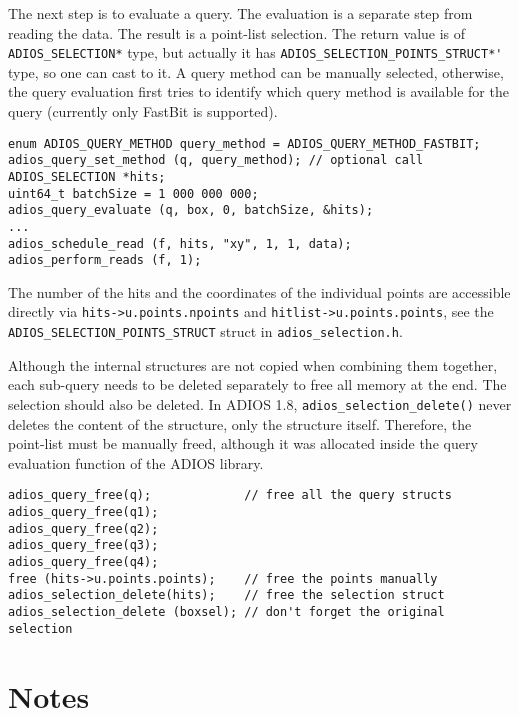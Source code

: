 \noindent The next step is to evaluate a query. The evaluation is a separate step from reading the data. The result is a point-list selection. The return value is of \verb+ADIOS_SELECTION*+ type, but actually it has \linebreak \verb+ADIOS_SELECTION_POINTS_STRUCT*'+ type, so one can cast to it. A query method can be manually selected, otherwise, the query evaluation first tries to identify which query method is available for the query (currently only FastBit is supported). 

\begin{lstlisting}[alsolanguage=C]
enum ADIOS_QUERY_METHOD query_method = ADIOS_QUERY_METHOD_FASTBIT;
adios_query_set_method (q, query_method); // optional call
ADIOS_SELECTION *hits;
uint64_t batchSize = 1 000 000 000;
adios_query_evaluate (q, box, 0, batchSize, &hits);
...
adios_schedule_read (f, hits, "xy", 1, 1, data);
adios_perform_reads (f, 1);
\end{lstlisting}

The number of the hits and the coordinates of the individual points are accessible directly via 
\linebreak \verb+hits->u.points.npoints+ and \verb+hitlist->u.points.points+, see the \verb+ADIOS_SELECTION_POINTS_STRUCT+ struct in \verb+adios_selection.h+.

Although the internal structures are not copied when combining them together, each sub-query needs to be deleted separately to free all memory at the end. The selection should also be deleted. In ADIOS 1.8, \linebreak \verb+adios_selection_delete()+ never deletes the content of the structure, only the structure itself. Therefore, the point-list must be manually freed, although it was allocated inside the query evaluation function of the ADIOS library. 

\begin{lstlisting}[alsolanguage=C]
adios_query_free(q);             // free all the query structs
adios_query_free(q1);
adios_query_free(q2);
adios_query_free(q3);
adios_query_free(q4);
free (hits->u.points.points);    // free the points manually
adios_selection_delete(hits);    // free the selection struct
adios_selection_delete (boxsel); // don't forget the original selection
\end{lstlisting}

%
%
\section{Notes}

